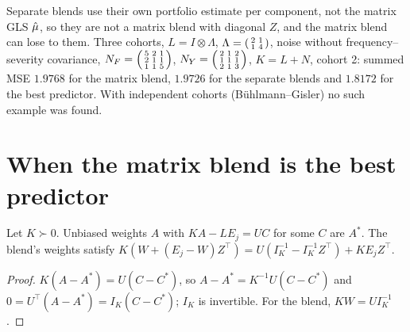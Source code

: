 \begin{remark}\label{rem:CV_separate}
  Separate blends use their own portfolio estimate per component, not the matrix GLS
  $\hat\mu$, so they are not a matrix blend with diagonal $Z$, and the matrix blend can lose to
  them. Three cohorts, $L = I \otimes \Lambda$, $\Lambda = \begin{psmallmatrix}2 & 1\\ 1 &
  4\end{psmallmatrix}$, noise without frequency--severity covariance,
  $N_F = \begin{psmallmatrix}5&2&1\\2&1&1\\1&1&5\end{psmallmatrix}$,
  $N_Y = \begin{psmallmatrix}2&1&2\\1&1&1\\2&1&3\end{psmallmatrix}$, $K = L + N$, cohort 2:
  summed MSE $1.9768$ for the matrix blend, $1.9726$ for the separate blends and $1.8172$ for
  the best predictor. With independent cohorts (Bühlmann--Gisler) no such example was found.
\end{remark}

\section*{When the matrix blend is the best predictor}

\begin{lemma}\label{lem:CV_blup_unique}
  \leanok
  Let $K \succ 0$. Unbiased weights $A$ with $KA - LE_j = UC$ for some $C$ are $A^\ast$.
  The blend's weights satisfy $K(W + (E_j - W)Z^\top) = U(I_K^{-1} - I_K^{-1}Z^\top) +
  KE_jZ^\top$.
\end{lemma}
\begin{proof}
  \leanok
  $K(A - A^\ast) = U(C - C^\ast)$, so $A - A^\ast = K^{-1}U(C - C^\ast)$ and
  $0 = U^\top(A - A^\ast) = I_K(C - C^\ast)$; $I_K$ is invertible. For the blend,
  $KW = UI_K^{-1}$.
\end{proof}

